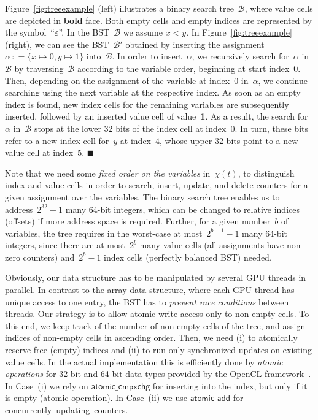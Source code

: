 \documentclass{llncs}
\newcommand{\eqdef}{\ensuremath{\,\mathrel{\mathop:}=}}
\let\epsilon=\varepsilon
\newcommand{\ops}[1]{\ensuremath{\mathsf{#1}}}
\renewenvironment{example}{\begin{EXa}}{\hfill\ensuremath{\blacksquare}\end{EXa}}
\begin{document}
%
%
%
%
%
%
%
%
%
%
%
%
%
%
%
%
%
%
%
%
%
%
%
%
%
%
%
%
%
%
%
%
%
%
%
%
%
%
%
%
%
%
%
%
%
%
%
%
%

%

\begin{example}\label{ex:bst}
  Figure~\ref{fig:treeexample} (left) illustrates a binary search
  tree~$\mathcal{B}$, where value cells are depicted in \textbf{bold}
  face. Both empty cells and empty indices are represented by the
  symbol~``$\epsilon$''.
%
  In the
  BST~$\mathcal{B}$ we assume $x<y$.
  In Figure~\ref{fig:treeexample} (right), we can see the
  BST~$\mathcal{B}'$ obtained by inserting the
  assignment~$\alpha\eqdef\{x\mapsto0, y\mapsto1\}$
  into~$\mathcal{B}$.
%
%
  In order to insert~$\alpha$, we recursively search for~$\alpha$ in~$\mathcal{B}$
  by traversing~$\mathcal{B}$ according to the variable order,
  beginning at start index~$0$.  Then, depending on the assignment of
  the variable at index~$0$ in~$\alpha$, we continue searching using
  the next variable at the respective index.
%
%
  As soon as an empty index is found, %
  new index cells for the remaining variables are
  subsequently inserted, followed by an inserted value cell of
  value~\textbf{1}.  As a result, the search for~$\alpha$
  in~$\mathcal{B}$ stops at the lower 32 bits of the index cell at
  index~$0$. In turn, these bits refer to a new index cell
  for~$y$ at index~$4$, whose upper 32 bits point to a new value
  cell at index~$5$.
\end{example}
%
%
Note that we need some \emph{fixed order on the variables}
in~$\chi(t)$, to distinguish index and value cells in order to
search, insert, update, and delete counters for a given assignment
over the variables.
%
The binary search tree enables us to address~$2^{32}-1$ many 64-bit
integers, which can be changed to relative indices (offsets) if more
address space is required.
%
%
%
%
Further, for a given number~$b$ of
variables, the tree requires in the worst-case at most~$2^{b+1}-1$
many 64-bit integers, since there are at most~$2^b$ many value cells
(all assignments have non-zero counters) and~$2^b-1$ index cells
(perfectly balanced BST) needed.
%
%

Obviously, our data structure has to be manipulated by several GPU
threads in parallel.  In contrast to the array data structure, where
each GPU thread has unique access to one entry, the BST has to
\emph{prevent race conditions} between threads.  Our strategy is
to allow atomic write access only to non-empty cells.
To this end, we keep track of the number of non-empty cells of the tree, and 
assign indices of non-empty cells in ascending order. 
Then, we need (i) to atomically reserve free (empty) indices and (ii) to run only synchronized updates on existing value cells.
%
In the actual implementation this is efficiently done by \emph{atomic
  operations} for 32-bit and 64-bit data types provided by the OpenCL
framework~\cite{MunshiGasterMattson11a}.
%
In Case~(i) we rely on \ops{atomic\_cmpxchg} for inserting into the index, but only if it is empty (atomic operation).
In Case~(ii) we use \ops{atomic\_add} for concurrently~updating~counters.
\end{document}
